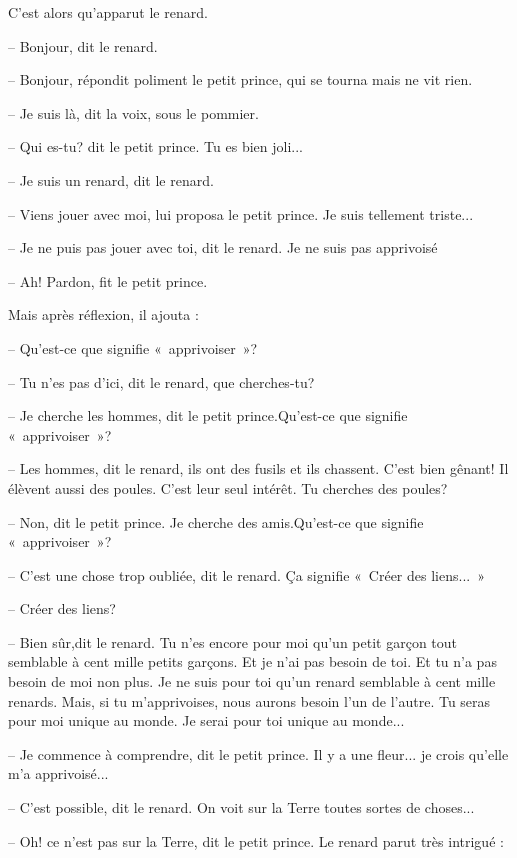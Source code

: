 \documentclass[a4paper]{report}
\begin{document}

\parachapter{} %
C'est alors qu'apparut le renard.

-- Bonjour, dit le renard.

-- Bonjour, répondit poliment le petit prince, qui se tourna mais ne vit rien.

-- Je suis là, dit la voix, sous le pommier.

-- Qui es-tu? dit le petit prince. Tu es bien joli...


-- Je suis un renard, dit le renard.

-- Viens jouer avec moi, lui proposa le petit prince. Je suis tellement triste...

-- Je ne puis pas jouer avec toi, dit le renard. Je ne suis pas apprivoisé

-- Ah! Pardon, fit le petit prince.

Mais après réflexion, il ajouta :

-- Qu'est-ce que signifie «~apprivoiser~»?

-- Tu n'es pas d'ici, dit le renard, que cherches-tu?

-- Je cherche les hommes, dit le petit prince.Qu'est-ce que signifie «~apprivoiser~»?

-- Les hommes, dit le renard, ils ont des fusils et ils chassent. C'est bien gênant! Il élèvent aussi des poules. C'est leur seul intérêt. Tu cherches des poules?

-- Non, dit le petit prince. Je cherche des amis.Qu'est-ce que signifie «~apprivoiser~»?

-- C'est une chose trop oubliée, dit le renard. Ça signifie «~Créer des liens...~»

-- Créer des liens?

-- Bien sûr,dit le renard. Tu n'es encore pour moi qu'un petit garçon tout semblable à cent mille petits garçons. Et je n'ai pas besoin de toi. Et tu n'a pas besoin de moi non plus. Je ne suis pour toi qu'un renard semblable à cent mille renards. Mais, si tu m'apprivoises, nous aurons besoin l'un de l'autre. Tu seras pour moi unique au monde. Je serai pour toi unique au monde...

-- Je commence à comprendre, dit le petit prince. Il y a une fleur... je crois qu'elle m'a apprivoisé...

-- C'est possible, dit le renard. On voit sur la Terre toutes sortes de choses...

-- Oh! ce n'est pas sur la Terre, dit le petit prince. Le renard parut très intrigué :
\end{document}
